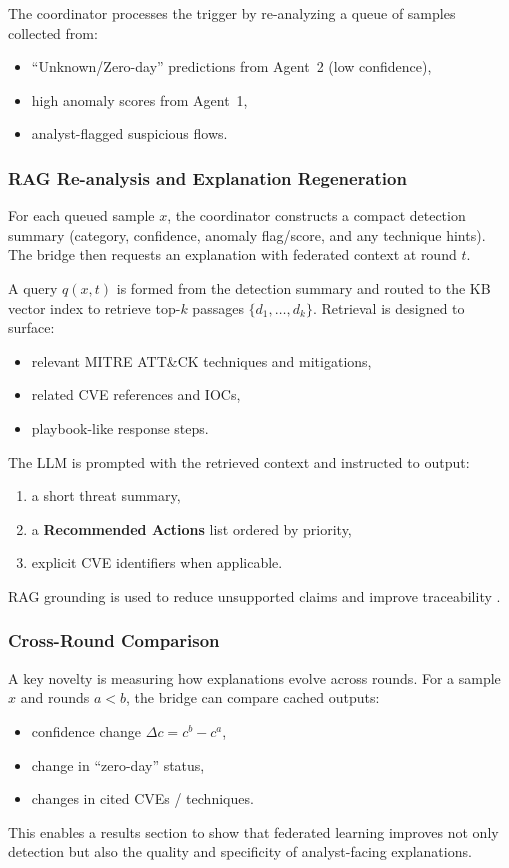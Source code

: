 \documentclass[conference]{IEEEtran}
\begin{document}
The coordinator processes the trigger by re-analyzing a queue of samples collected from:
\begin{itemize}
  \item ``Unknown/Zero-day'' predictions from Agent~2 (low confidence),
  \item high anomaly scores from Agent~1,
  \item analyst-flagged suspicious flows.
\end{itemize}

\subsubsection{RAG Re-analysis and Explanation Regeneration}
\label{sec:rag-reanalysis}

For each queued sample $x$, the coordinator constructs a compact detection summary (category, confidence, anomaly flag/score, and any technique hints). The bridge then requests an explanation with federated context at round $t$.

A query $q(x,t)$ is formed from the detection summary and routed to the KB vector index to retrieve top-$k$ passages $\{d_1,\dots,d_k\}$. Retrieval is designed to surface:
\begin{itemize}
  \item relevant MITRE ATT\&CK techniques and mitigations,
  \item related CVE references and IOCs,
  \item playbook-like response steps.
\end{itemize}

The LLM is prompted with the retrieved context and instructed to output:
\begin{enumerate}
  \item a short threat summary,
  \item a \textbf{Recommended Actions} list ordered by priority,
  \item explicit CVE identifiers when applicable.
\end{enumerate}
RAG grounding is used to reduce unsupported claims and improve traceability \cite{Lewis2020RAG}.

\subsubsection{Cross-Round Comparison}
\label{sec:cross-round}

A key novelty is measuring how explanations evolve across rounds. For a sample $x$ and rounds $a<b$, the bridge can compare cached outputs:
\begin{itemize}
  \item confidence change $\Delta c = c^{b}-c^{a}$,
  \item change in ``zero-day'' status,
  \item changes in cited CVEs / techniques.
\end{itemize}
This enables a results section to show that federated learning improves not only detection but also the quality and specificity of analyst-facing explanations.
\end{document}
